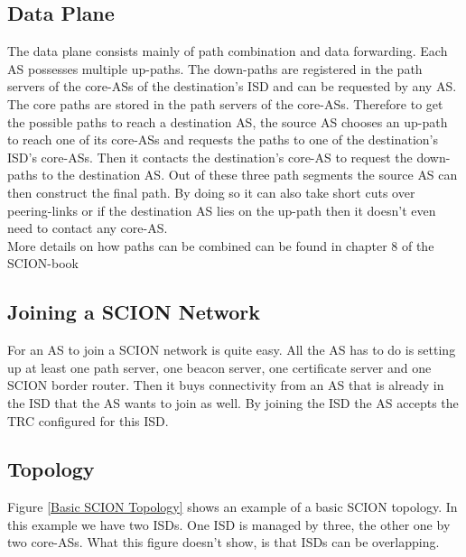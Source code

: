 \subsection{Data Plane}

The data plane consists mainly of path combination and data forwarding. Each \acs{AS} possesses multiple up-paths. The down-paths are registered in the path servers of the core-\acsp{AS} of the destination's \acs{ISD} and can be requested by any \acs{AS}. The core paths are stored in the path servers of the core-\acsp{AS}. Therefore to get the possible paths to reach a destination \acs{AS}, the source \acs{AS} chooses an up-path to reach one of its core-\acsp{AS} and requests the paths to one of the destination's \acs{ISD}'s core-\acsp{AS}. Then it contacts the destination's core-\acs{AS} to request the down-paths to the destination \acs{AS}. Out of these three path segments the source \acs{AS} can then construct the final path. By doing so it can also take short cuts over peering-links or if the destination \acs{AS} lies on the up-path then it doesn't even need to contact any core-\acs{AS}.
\\
More details on how paths can be combined can be found in chapter 8 of the \acs{SCION}-book \cite{perrig2017scion}

\subsection{Joining a SCION Network}
For an \acs{AS} to join a \acs{SCION} network is quite easy. All the \acs{AS} has to do is setting up at least one path server, one beacon server, one certificate server and one \acs{SCION} border router. Then it buys connectivity from an AS that is already in the \acs{ISD} that the \acs{AS} wants to join as well. By joining the \acs{ISD} the \acs{AS} accepts the \acs{TRC} configured for this \acs{ISD}.

\newpage

\subsection{Topology}
Figure \ref{Basic SCION Topology} shows an example of a basic \acs{SCION} topology. In this example we have two \aclp{ISD}. One \acs{ISD} is managed by three, the other one by two core-\acsp{AS}. What this figure doesn't show, is that \acsp{ISD} can be overlapping. 

